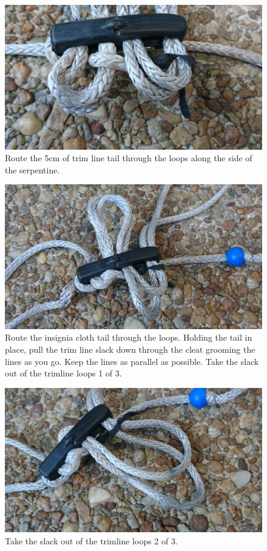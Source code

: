 \documentclass[]{book}
\begin{document}
\begin{figure}

{\centering \includegraphics[width=0.7\linewidth]{images/threading_the_cleat_2} 

}

\caption{Route the 5cm of trim line tail through the loops along the side of the serpentine.}\label{fig:thread-cleat-2}
\end{figure}

\begin{figure}

{\centering \includegraphics[width=0.7\linewidth]{images/threading_the_cleat_3} 

}

\caption{Route the insignia cloth tail through the loops. Holding the tail in place, pull the trim line slack down through the cleat grooming the lines as you go. Keep the lines as parallel as possible. Take the slack out of the trimline loops 1 of 3.}\label{fig:thread-cleat-3}
\end{figure}

\begin{figure}

{\centering \includegraphics[width=0.7\linewidth]{images/threading_the_cleat_4} 

}

\caption{Take the slack out of the trimline loops 2 of 3.}\label{fig:thread-cleat-4}
\end{figure}
\end{document}
